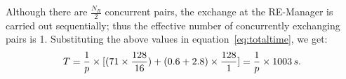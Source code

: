 \documentclass{rspublic}
\newcommand{\jhanote}[1]{ {\textcolor{red} { ***shantenu: #1 }}}
\newcommand{\alnote}[1]{ {\textcolor{blue} { ***andre: #1 }}}
\newcommand{\athotanote}[1]{ {\textcolor{green} { ***athota: #1 }}}
\newcommand{\alnote}[1]{}
\newcommand{\athotanote}[1]{}
\newcommand{\jhanote}[1]{}
\begin{document}
Although there are $\frac{N_R}{2}$ concurrent pairs, the exchange 
at the RE-Manager is carried out sequentially; thus the effective 
number of concurrently exchanging pairs is 1. 
Substituting the above values in equation~\ref{eq:totaltime}, we get:
\begin{eqnarray}
  T=  {1 \over p} \times {[ {(71\times {128\over 16}})+ (0.6 + 2.8)\times {128 \over 1}]} = {1 \over p} \times 1003\,s.
  \label{eq:sync}
\end{eqnarray}






\end{document}
